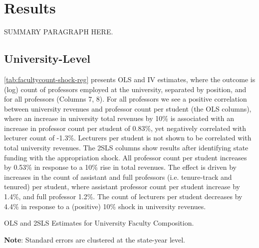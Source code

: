 \section{Results}
\label{sec:results}

SUMMARY PARAGRAPH HERE.


\subsection{University-Level}

\autoref{tab:facultycount-shock-reg} presents OLS and IV estimates, where the outcome is (log) count of professors employed at the university, separated by position, and for all professors (Columns 7, 8).
For all professors we see a positive correlation between university revenues and professor count per student (the OLS columns), where an increase in university total revenues by 10\% is associated with an increase in professor count per student of 0.83\%, yet negatively correlated with lecturer count of -1.3\%.
Lecturers per student is not shown to be correlated with total university revenues.
The 2SLS columns show results after identifying state funding with the appropriation shock.
All professor count per student increases by 0.53\% in response to a 10\% rise in total revenues.
The effect is driven by increases in the count of assistant and full professors (i.e. tenure-track and tenured) per student, where assistant professor count per student increase by 1.4\%, and full professor 1.2\%.
The count of lecturers per student decreases by 4.4\% in response to a (positive) 10\% shock in university revenues.

\begin{table}[h!]
    \singlespacing
    \centering
    \caption{OLS and 2SLS Estimates for University Faculty Composition.}
    \makebox[\textwidth][c]{}
    \begin{flushleft}
        \footnotesize
        \textbf{Note}: Standard errors are clustered at the state-year level.
    \end{flushleft}
    \label{tab:facultycount-shock-reg}
\end{table}

